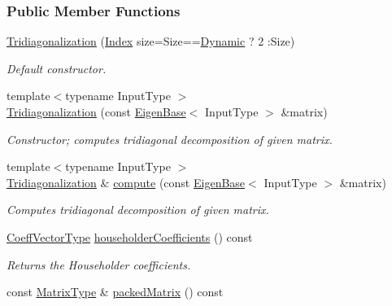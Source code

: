 \subsubsection*{Public Member Functions}
\begin{DoxyCompactItemize}
\item 
\hyperlink{group___eigenvalues___module_a9ea2e6154bf35494ee68e037f0867cbd}{Tridiagonalization} (\hyperlink{group___eigenvalues___module_a7bd1f9fccec1e93b77a2214b2d30aae9}{Index} size=Size==\hyperlink{namespace_eigen_ad81fa7195215a0ce30017dfac309f0b2}{Dynamic} ? 2 \+:Size)
\begin{DoxyCompactList}\small\item\em Default constructor. \end{DoxyCompactList}\item 
{\footnotesize template$<$typename Input\+Type $>$ }\\\hyperlink{group___eigenvalues___module_a05406b7df9a92fdcba72d31443f67a98}{Tridiagonalization} (const \hyperlink{group___core___module_struct_eigen_1_1_eigen_base}{Eigen\+Base}$<$ Input\+Type $>$ \&matrix)
\begin{DoxyCompactList}\small\item\em Constructor; computes tridiagonal decomposition of given matrix. \end{DoxyCompactList}\item 
{\footnotesize template$<$typename Input\+Type $>$ }\\\hyperlink{group___eigenvalues___module_class_eigen_1_1_tridiagonalization}{Tridiagonalization} \& \hyperlink{group___eigenvalues___module_acd288abb081d3b40b87e4b98cd8f6ee9}{compute} (const \hyperlink{group___core___module_struct_eigen_1_1_eigen_base}{Eigen\+Base}$<$ Input\+Type $>$ \&matrix)
\begin{DoxyCompactList}\small\item\em Computes tridiagonal decomposition of given matrix. \end{DoxyCompactList}\item 
\hyperlink{group___core___module}{Coeff\+Vector\+Type} \hyperlink{group___eigenvalues___module_ac95b4e43dcf6c3c5074b8bea4fc67887}{householder\+Coefficients} () const
\begin{DoxyCompactList}\small\item\em Returns the Householder coefficients. \end{DoxyCompactList}\item 
const \hyperlink{group___eigenvalues___module_add0f4b2216d0ea8ee0f7d8525deaf0a9}{Matrix\+Type} \& \hyperlink{group___eigenvalues___module_a47858b3895e64acafb1bb2e97f98a154}{packed\+Matrix} () const

\end{DoxyCompactItemize}
